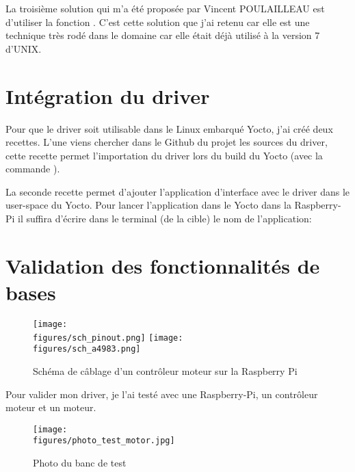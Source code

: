 La troisième solution qui m'a été proposée par Vincent POULAILLEAU est d'utiliser la fonction . C'est cette solution que j'ai retenu car elle est une technique très rodé dans le domaine car elle était déjà utilisé à la version 7 d'UNIX. 

\section{Intégration du driver}

Pour que le driver soit utilisable dans le Linux embarqué Yocto, j'ai créé deux recettes. L'une viens chercher dans le Github du projet les sources du driver, cette recette permet l'importation du driver lors du build du Yocto (avec la commande ).

La seconde recette permet d'ajouter l'application d'interface avec le driver dans le user-space du Yocto. Pour lancer l'application dans le Yocto dans la Raspberry-Pi il suffira d'écrire dans le terminal (de la cible) le nom de l'application: 

\section{Validation des fonctionnalités de bases}

\begin{figure}[H]
    \centering
    \texttt{[image: \\figures/sch\_pinout.png]}
    \texttt{[image: \\figures/sch\_a4983.png]}
    \decoRule
    \caption[
    Schéma de câblage d'un contrôleur moteur sur la Raspberry Pi]{
    Schéma de câblage d'un contrôleur moteur sur la Raspberry Pi}
    \label{fig:Schéma de câblage d'un contrôleur moteur sur la Raspberry Pi}
    \end{figure}

\vspace{1cm}

Pour valider mon driver, je l'ai testé avec une Raspberry-Pi, un contrôleur moteur et un moteur.

\begin{figure}[H]
    \centering
    \texttt{[image: \\figures/photo\_test\_motor.jpg]}
    \decoRule
    \caption[
    Photo du banc de test]{
	Photo du banc de test}
    \label{fig:Photo du banc de test}
    \end{figure}

\vspace{1cm}

